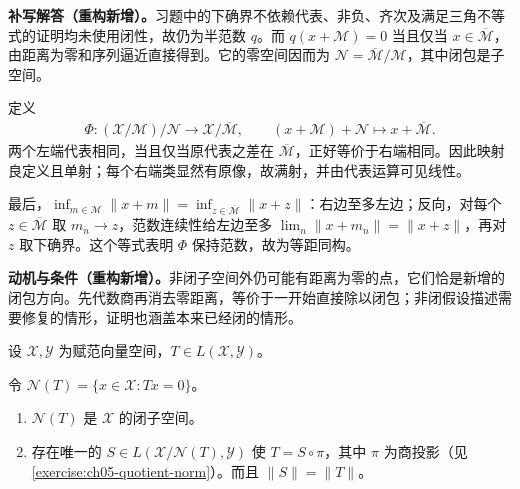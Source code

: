 \documentclass[../../main.tex]{subfiles}
\begin{document}
\begin{solution}
\textbf{补写解答（重构新增）。}习题中的下确界不依赖代表、非负、齐次及满足三角不等式的证明均未使用闭性，故仍为半范数 $q$。而 $q(x+\mathcal M)=0$ 当且仅当 $x\in\overline{\mathcal M}$，由距离为零和序列逼近直接得到。它的零空间因而为 $\mathcal N=\overline{\mathcal M}/\mathcal M$，其中闭包是子空间。

定义
\begin{align*}
\Phi:(\mathcal X/\mathcal M)/\mathcal N\longrightarrow\mathcal X/\overline{\mathcal M},
\qquad (x+\mathcal M)+\mathcal N\longmapsto x+\overline{\mathcal M}.
\end{align*}
两个左端代表相同，当且仅当原代表之差在 $\overline{\mathcal M}$，正好等价于右端相同。因此映射良定义且单射；每个右端类显然有原像，故满射，并由代表运算可见线性。

最后，$\inf_{m\in\mathcal M}\|x+m\|=\inf_{z\in\overline{\mathcal M}}\|x+z\|$：右边至多左边；反向，对每个 $z\in\overline{\mathcal M}$ 取 $m_n\to z$，范数连续性给左边至多 $\lim_n\|x+m_n\|=\|x+z\|$，再对 $z$ 取下确界。这个等式表明 $\Phi$ 保持范数，故为等距同构。
\end{solution}
\begin{remark}
\textbf{动机与条件（重构新增）。}非闭子空间外仍可能有距离为零的点，它们恰是新增的闭包方向。先代数商再消去零距离，等价于一开始直接除以闭包；非闭假设描述需要修复的情形，证明也涵盖本来已经闭的情形。
\end{remark}
\begin{exercise}\label{exercise:ch05-kernel-factorization}
设 $\mathcal X,\mathcal Y$ 为赋范向量空间，$T\in L(\mathcal X,\mathcal Y)$。
\begin{definition*}[本题的零空间]\label{definition:ch05-operator-kernel}
令 $\mathcal N(T)=\{x\in\mathcal X:Tx=0\}$。
\end{definition*}
\begin{enumerate}
\item\label{item:ch05-kernel-closed} $\mathcal N(T)$ 是 $\mathcal X$ 的闭子空间。
\item\label{item:ch05-kernel-factor} 存在唯一的 $S\in L(\mathcal X/\mathcal N(T),\mathcal Y)$ 使 $T=S\circ\pi$，其中 $\pi$ 为商投影（见\cref{exercise:ch05-quotient-norm}）。而且 $\|S\|=\|T\|$。
\end{enumerate}
\end{exercise}
\end{document}
